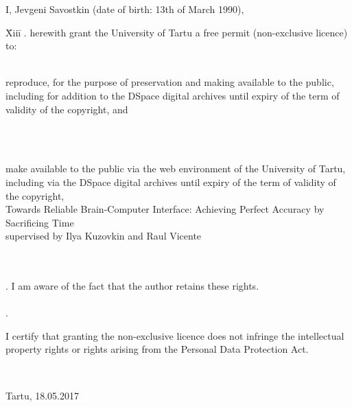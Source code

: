 \documentclass[12pt]{article}
\theoremstyle{definition}
\begin{document}
I, Jevgeni Savostkin (date of birth: 13th of March 1990),

\begin{tabbing}
\= Xiii\=\kill
{}. \> herewith grant the University of Tartu a free permit (non-exclusive licence) to:\\\\ 

\> 
\begin{minipage}[t]{14.2cm}
reproduce, for the purpose of preservation and making available to the public, including for addition to the DSpace digital archives until expiry of the term of validity of the copyright, and
\end{minipage}
\\\\
\begin{minipage}[t]{14.2cm}
make available to the public via the web environment of the University of Tartu, including via the DSpace digital archives until expiry of the term of validity of the copyright,\\ 

Towards Reliable Brain-Computer Interface: Achieving Perfect Accuracy by Sacrificing Time\\   

supervised by Ilya Kuzovkin and Raul Vicente

\end{minipage}\\\\ 
. \>I am aware of the fact that the author retains these rights.\\\\
. \>
\begin{minipage}[t]{14.2cm}
I certify that granting the non-exclusive licence does not infringe the intellectual property rights or rights arising from the Personal Data Protection Act. 
\end{minipage}\\
\end{tabbing}

\noindent
Tartu, 18.05.2017
\end{document}
